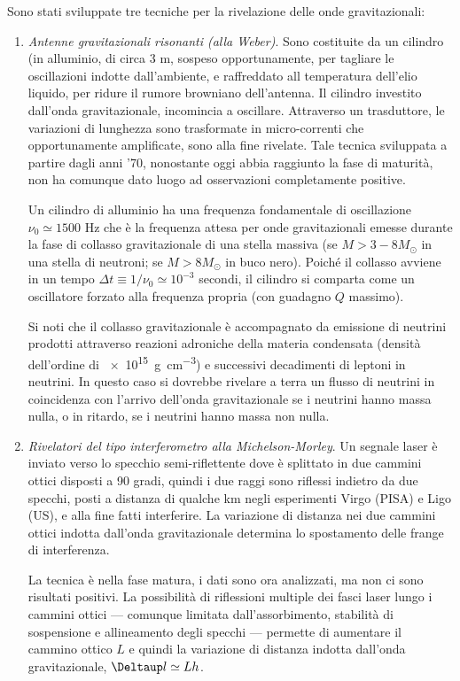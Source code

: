 Sono stati sviluppate tre tecniche per la rivelazione delle onde gravitazionali:
\begin{enumerate}
\item \emph{Antenne gravitazionali risonanti (alla Weber)}.  Sono costituite da
  un cilindro (in alluminio, di circa 3 m, sospeso opportunamente, per tagliare
  le oscillazioni indotte dall'ambiente, e raffreddato all temperatura dell'elio
  liquido, per ridure il rumore browniano dell'antenna.  Il cilindro investito
  dall'onda gravitazionale, incomincia a oscillare.  Attraverso un trasduttore,
  le variazioni di lunghezza sono trasformate in micro-correnti che
  opportunamente amplificate, sono alla fine rivelate.  Tale tecnica sviluppata
  a partire dagli anni '70, nonostante oggi abbia raggiunto la fase di maturità,
  non ha comunque dato luogo ad osservazioni completamente positive.

  Un cilindro di alluminio ha una frequenza fondamentale di oscillazione
  $\nu_0 \simeq 1500$ Hz che è la frequenza attesa per onde gravitazionali
  emesse durante la fase di collasso gravitazionale di una stella massiva (se
  $M > 3-8 M_{\odot}$ in una stella di neutroni; se $M > 8 M_{\odot}$ in buco
  nero).  Poiché il collasso avviene in un tempo
  $\Delta t \equiv 1/\nu_0 \simeq 10^{-3}$ secondi, il cilindro si comparta come
  un oscillatore forzato alla frequenza propria (con guadagno $Q$ massimo).

  Si noti che il collasso gravitazionale è accompagnato da emissione di neutrini
  prodotti attraverso reazioni adroniche della materia condensata (densità
  dell'ordine di \SI{e15}{\gram \per \centi \metre \cubed}) e successivi
  decadimenti di leptoni in neutrini.  In questo caso si dovrebbe rivelare a
  terra un flusso di neutrini in coincidenza con l'arrivo dell'onda
  gravitazionale se i neutrini hanno massa nulla, o in ritardo, se i neutrini
  hanno massa non nulla.
\item \emph{Rivelatori del tipo interferometro alla Michelson-Morley}.  Un
  segnale laser è inviato verso lo specchio semi-riflettente dove è splittato in
  due cammini ottici disposti a 90 gradi, quindi i due raggi sono riflessi
  indietro da due specchi, posti a distanza di qualche km negli esperimenti
  Virgo (PISA) e Ligo (US), e alla fine fatti interferire.  La variazione di
  distanza nei due cammini ottici indotta dall'onda gravitazionale determina lo
  spostamento delle frange di interferenza.

  La tecnica è nella fase matura, i dati sono ora analizzati, ma non ci sono
  risultati positivi.  La possibilità di riflessioni multiple dei fasci laser
  lungo i cammini ottici --- comunque limitata dall'assorbimento, stabilità di
  sospensione e allineamento degli specchi --- permette di aumentare il cammino
  ottico $L$ e quindi la variazione di distanza indotta dall'onda
  gravitazionale, $\var l \simeq L h$.


\end{enumerate}
